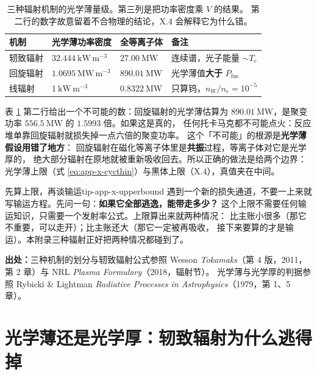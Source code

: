 \begin{table}[htbp]
\centering
\small
\caption{三种辐射机制的光学薄量级。第三列是把功率密度乘 $V$ 的结果。
第二行的数字故意留着不合物理的结论，X.4 会解释它为什么错。}
\label{tab:app-x-channel}
\begin{tabular}{p{2.5cm}p{3.1cm}p{2.9cm}p{4.6cm}}
\toprule
机制 & 光学薄功率密度 & 全等离子体 & 备注 \\
\midrule
轫致辐射 & $32.444\ \mathrm{kW\,m^{-3}}$ & $27.00\ \mathrm{MW}$ & 连续谱，光子能量 $\sim T_e$ \\
回旋辐射 & $1.0695\ \mathrm{MW\,m^{-3}}$ & $890.01\ \mathrm{MW}$ & 光学薄值\textbf{大于} $P_{\mathrm{fus}}$ \\
线辐射 & $1\ \mathrm{kW\,m^{-3}}$ & $0.8322\ \mathrm{MW}$ & 只算钨，$n_W/n_e=10^{-5}$ \\
\bottomrule
\end{tabular}

\end{table}

表 \ref{tab:app-x-channel} 第二行给出一个不可能的数：回旋辐射的光学薄估算为
$890.01\ \mathrm{MW}$，是聚变功率 $556.5\ \mathrm{MW}$ 的 $1.5993$ 倍。如果这是真的，
任何托卡马克都不可能点火：反应堆单靠回旋辐射就损失掉一点六倍的聚变功率。
这个「不可能」的根源是\textbf{光学薄假设用错了地方}：
回旋辐射在磁化等离子体里是\textbf{共振}过程，等离子体对它是光学厚的，
绝大部分辐射在原地就被重新吸收回去。所以正确的做法是给两个边界：
光学薄上限（式 \eqref{eq:app-x-cycthin}）与黑体上限（X.4），真值夹在中间。

\begin{tip}{先算上限，再谈输运}{tip-app-x-upperbound}
遇到一个新的损失通道，不要一上来就写输运方程。先问一句：\textbf{如果它全部逃逸，能带走多少？}
这个上限不需要任何输运知识，只需要一个发射率公式。上限算出来就两种情况：
比主账小很多（那它不重要，可以走开）；比主账还大（那它一定被再吸收，
接下来要算的才是输运）。本附录三种辐射正好把两种情况都碰到了。
\end{tip}

{\footnotesize
\textbf{出处：}三种机制的划分与轫致辐射公式参照 Wesson \emph{Tokamaks}（第 4 版，2011，
第 2 章）与 NRL \emph{Plasma Formulary}（2018，辐射节）。
光学薄与光学厚的判据参照
Rybicki \& Lightman \emph{Radiative Processes in Astrophysics}（1979，第 1、5 章）。
}

\section{光学薄还是光学厚：轫致辐射为什么逃得掉}
\label{sec:app-x-opacity}

